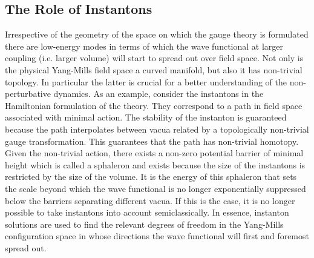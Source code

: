 \documentclass[12pt]{book}
\newcommand{\site}[1]{\refnote{\cite{#1}}}
\begin{document}
\subsection{The Role of Instantons}
Irrespective of the geometry of the space on which the gauge theory is
formulated there are low-energy modes in terms of which the wave functional
at larger coupling (i.e. larger volume) will start to spread out over field
space. Not only is the physical Yang-Mills field space a curved 
manifold\site{bavi}, but also it has non-trivial topology\site{sing}.
In particular the latter is crucial for a better understanding of the 
non-perturbative dynamics. As an example, consider the instantons in the 
Hamiltonian formulation of the theory. They correspond to a path in field 
space associated with minimal action. The stability of the instanton is
guaranteed because the path interpolates between vacua related by a 
topologically non-trivial gauge transformation. This guarantees that the path 
has non-trivial homotopy. Given the non-trivial action, there exists a 
non-zero potential barrier of minimal height which is called a sphaleron and 
exists because the size of the instantons is restricted by the size of the 
volume. It is the energy of this sphaleron that sets the scale beyond which 
the wave functional is no longer exponentially suppressed below the barriers 
separating different vacua. If this is the case, it is no longer possible to 
take instantons into account semiclassically. In essence, instanton solutions 
are used to find the relevant degrees of freedom in the Yang-Mills 
configuration space in whose directions the wave functional will 
first and foremost spread out.
\end{document}
